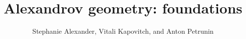 \frontmatter
\title{Alexandrov geometry: foundations}
\date{}
\author{Stephanie Alexander, Vitali Kapovitch, and Anton Petrunin}
\maketitle
